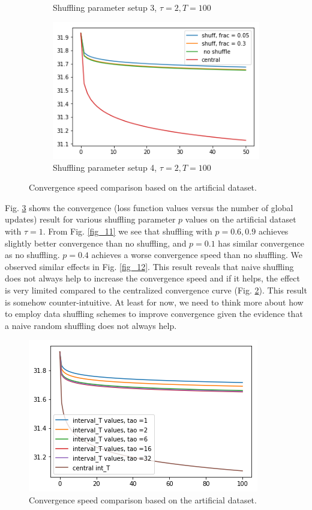 \documentclass[11pt, fullpage,letterpaper]{article}
\begin{document}
\begin{enumerate}
\begin{figure}
\begin{subfigure}{.5\textwidth}
  \caption{Shuffling parameter setup 3, $\tau =2, T=100$}
  \label{fig_13}
\end{subfigure}%
\begin{subfigure}{.5\textwidth}
  \centering
  \includegraphics[width=\linewidth]{figure_4_tao2}
 \caption{Shuffling parameter setup 4, $\tau =2, T=100$}
 \label{fig_14}
\end{subfigure}
\caption{Convergence speed comparison based on the artificial dataset.}
\label{fig_1}
\end{figure}

Fig. \ref{fig_1} shows the convergence (loss function values versus the number of global updates) result for various shuffling parameter $p$ values on the artificial dataset with $\tau =1$. From Fig. \ref{fig_11} we see that shuffling with $p=0.6,0.9$ achieves slightly better convergence than no shuffling, and $p=0.1$ has similar convergence as no shuffling. $p=0.4$ achieves a worse convergence speed than no shuffling. We observed similar effects in Fig. \ref{fig_12}. This result reveals that naive shuffling does not always help to increase the convergence speed and if it helps, the effect is very limited compared to the centralized convergence curve (Fig. \ref{fig_14}). This result is somehow counter-intuitive. At least for now, we need to think more about how to employ data shuffling schemes to improve convergence given the evidence that a naive random shuffling does not always help.
\begin{figure}
  \centering
  \includegraphics[width=0.6\linewidth]{fig_no_shuffle}
\caption{Convergence speed comparison based on the artificial dataset.}
\label{fig_3}
\end{figure}


\end{enumerate}
\end{document}
